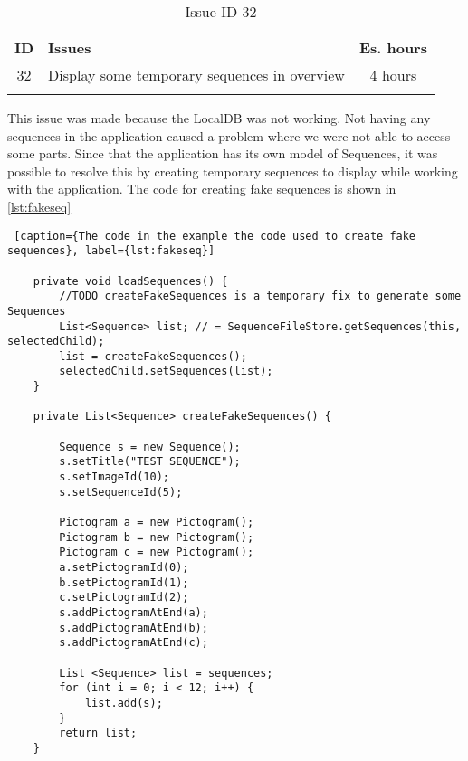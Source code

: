\begin{longtable} { | c | p{12cm} | c | } 
\hline
	ID 	&	Issues	&		 Es. hours \\\hline
	32 	&	Display some temporary sequences in overview	&	4 hours \\\hline
\caption{Issue ID 32}
\label{tab:spr2_fakesequences}
\end{longtable}

This issue was made because the LocalDB was not working. Not having any sequences in the application caused a problem where we were not able to access some parts. Since that the application has its own model of Sequences, it was possible to resolve this by creating temporary sequences to display while working with the application. The code for creating fake sequences is shown in \ref{lst:fakeseq}

\begin{lstlisting} [caption={The code in the example the code used to create fake sequences}, label={lst:fakeseq}]

	private void loadSequences() {
        //TODO createFakeSequences is a temporary fix to generate some Sequences
	    List<Sequence> list; // = SequenceFileStore.getSequences(this, selectedChild);
		list = createFakeSequences();
        selectedChild.setSequences(list);
	}

    private List<Sequence> createFakeSequences() {

        Sequence s = new Sequence();
        s.setTitle("TEST SEQUENCE");
        s.setImageId(10);
        s.setSequenceId(5);

        Pictogram a = new Pictogram();
        Pictogram b = new Pictogram();
        Pictogram c = new Pictogram();
        a.setPictogramId(0);
        b.setPictogramId(1);
        c.setPictogramId(2);
        s.addPictogramAtEnd(a);
        s.addPictogramAtEnd(b);
        s.addPictogramAtEnd(c);

        List <Sequence> list = sequences;
        for (int i = 0; i < 12; i++) {
            list.add(s);
        }
        return list;
    }

\end{lstlisting}